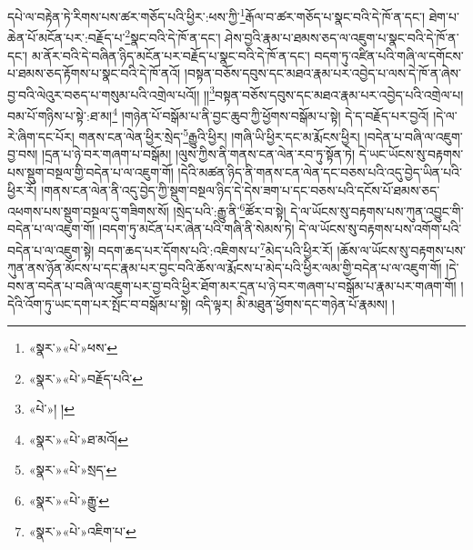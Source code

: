 དཔེ་ལ་བརྟེན་ཏེ་རིགས་པས་ཚར་གཅོད་པའི་ཕྱིར་:ཕས་ཀྱི་\footnote{«སྣར་»«པེ་»ཕས་}རྒོལ་བ་ཚར་གཅོད་པ་སྣང་བའི་དེ་ཁོ་ན་དང་། ཐེག་པ་ཆེན་པོ་མངོན་པར་:བརྗོད་པ་\footnote{«སྣར་»«པེ་»བརྗོད་པའི་}སྣང་བའི་དེ་ཁོ་ན་དང་། ཤེས་བྱའི་རྣམ་པ་ཐམས་ཅད་ལ་འཇུག་པ་སྣང་བའི་དེ་ཁོ་ན་དང་། མ་ནོར་བའི་དེ་བཞིན་ཉིད་མངོན་པར་བརྗོད་པ་སྣང་བའི་དེ་ཁོ་ན་དང་། བདག་ཏུ་འཛིན་པའི་གཞི་ལ་དགོངས་པ་ཐམས་ཅད་རྟོགས་པ་སྣང་བའི་དེ་ཁོ་ནའོ། །བསྟན་བཅོས་དབུས་དང་མཐའ་རྣམ་པར་འབྱེད་པ་ལས་དེ་ཁོ་ན་ཞེས་བྱ་བའི་ལེའུར་བཅད་པ་གསུམ་པའི་འགྲེལ་པའོ།། །།\footnote{«པེ་»། །}བསྟན་བཅོས་དབུས་དང་མཐའ་རྣམ་པར་འབྱེད་པའི་འགྲེལ་པ། བམ་པོ་གཉིས་པ་སྟེ་:ཐ་མ།\footnote{«སྣར་»«པེ་»ཐ་མའོ།} །གཉེན་པོ་བསྒོམ་པ་ནི་བྱང་ཆུབ་ཀྱི་ཕྱོགས་བསྒོམ་པ་སྟེ། དེ་ད་བརྗོད་པར་བྱའོ། །དེ་ལ་རེ་ཞིག་དང་པོར། གནས་ངན་ལེན་ཕྱིར་སྲེད་\footnote{«སྣར་»«པེ་»སྲད་}རྒྱུའི་ཕྱིར། །གཞི་ཡི་ཕྱིར་དང་མ་རྨོངས་ཕྱིར། །བདེན་པ་བཞི་ལ་འཇུག་བྱ་བས། །དྲན་པ་ཉེ་བར་གཞག་པ་བསྒོམ། །ལུས་ཀྱིས་ནི་གནས་ངན་ལེན་རབ་ཏུ་སྟོན་ཏེ། དེ་ཡང་ཡོངས་སུ་བརྟགས་པས་སྡུག་བསྔལ་གྱི་བདེན་པ་ལ་འཇུག་གོ། །དེའི་མཚན་ཉིད་ནི་གནས་ངན་ལེན་དང་བཅས་པའི་འདུ་བྱེད་ཡིན་པའི་ཕྱིར་རོ། །གནས་ངན་ལེན་ནི་འདུ་བྱེད་ཀྱི་སྡུག་བསྔལ་ཉིད་དེ་དེས་ཟག་པ་དང་བཅས་པའི་དངོས་པོ་ཐམས་ཅད་འཕགས་པས་སྡུག་བསྔལ་དུ་གཟིགས་སོ། །སྲེད་པའི་:རྒྱུ་ནི་\footnote{«སྣར་»«པེ་»རྒྱུ་}ཚོར་བ་སྟེ། དེ་ལ་ཡོངས་སུ་བརྟགས་པས་ཀུན་འབྱུང་གི་བདེན་པ་ལ་འཇུག་གོ། །བདག་ཏུ་མངོན་པར་ཞེན་པའི་གཞི་ནི་སེམས་ཏེ། དེ་ལ་ཡོངས་སུ་བརྟགས་པས་འགོག་པའི་བདེན་པ་ལ་འཇུག་སྟེ། བདག་ཆད་པར་དོགས་པའི་:འཇིགས་པ་\footnote{«སྣར་»«པེ་»འཇིག་པ་}མེད་པའི་ཕྱིར་རོ། །ཆོས་ལ་ཡོངས་སུ་བརྟགས་པས་ཀུན་ནས་ཉོན་མོངས་པ་དང་རྣམ་པར་བྱང་བའི་ཆོས་ལ་རྨོངས་པ་མེད་པའི་ཕྱིར་ལམ་གྱི་བདེན་པ་ལ་འཇུག་གོ། །དེ་བས་ན་བདེན་པ་བཞི་ལ་འཇུག་པར་བྱ་བའི་ཕྱིར་ཐོག་མར་དྲན་པ་ཉེ་བར་གཞག་པ་བསྒོམ་པ་རྣམ་པར་གཞག་གོ། །དེའི་འོག་ཏུ་ཡང་དག་པར་སྤོང་བ་བསྒོམ་པ་སྟེ། འདི་ལྟར། མི་མཐུན་ཕྱོགས་དང་གཉེན་པོ་རྣམས། །
